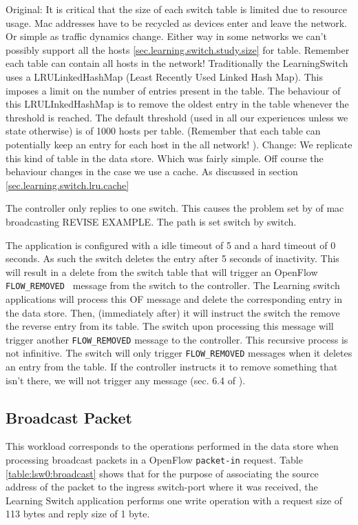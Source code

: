 Original: It is critical that the size of each switch table is limited 
due to resource usage.  Mac addresses have to be recycled as devices enter and leave the network. Or simple as traffic dynamics change. Either way in some networks we can't possibly support all the hosts \ref{sec.learning.switch.study.size} for table. Remember each table can contain all hosts in the network! Traditionally the LearningSwitch uses a LRULinkedHashMap (Least Recently Used Linked Hash Map). This imposes a limit on the number of entries present in the table. The behaviour of this LRULInkedHashMap is to remove the oldest entry in the table whenever the threshold is reached.  The default threshold (used in all our experiences unless we state otherwise) is of 1000 hosts per table. (Remember that each table can potentially keep an entry for each host in the all network! ). 
Change:  We replicate this kind of table in the data store. Which was fairly simple. Off course the behaviour changes in the case we use a cache. As discussed in section \ref{sec.learning.switch.lru.cache}

The controller only replies to one switch.  This causes the problem set by \cite{of.cpp} of mac broadcasting REVISE EXAMPLE.  The path is set switch by switch. 

The application is configured with a idle timeout of 5 and a hard timeout of 0 seconds. As such the switch deletes the entry after 5 seconds of inactivity. This will result in a delete from the switch table that will trigger an OpenFlow \texttt{FLOW\_REMOVED } message from the switch to the controller. The Learning switch applications will process this OF message and delete the corresponding entry in the data store. Then, (immediately after) it will instruct the switch the remove the reverse entry from its table. The switch upon processing this message will trigger another \texttt{FLOW\_REMOVED} message to the controller.  This recursive process is not infinitive. The switch will only trigger \texttt{FLOW\_REMOVED} messages when it deletes an entry from the table. If the controller instructs it to remove something that isn't there, we will not trigger any message (sec. 6.4 of \cite{openflow-spec}). 


\subsection{Broadcast Packet}
This workload corresponds to the operations performed in the data
store when processing broadcast packets in a OpenFlow
\texttt{packet-in} request.  Table \ref{table:lsw0:broadcast} shows that for the
purpose of associating the source address of the packet to the ingress
switch-port where it was received, the Learning Switch application performs one
write operation with a request size of 113 bytes and reply size of 1
byte. 

